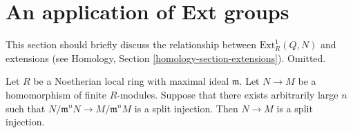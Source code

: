 \section{An application of Ext groups}
\label{section-ext-application}

\noindent
This section should briefly discuss the relationship between
$\text{Ext}^1_R(Q, N)$ and extensions (see
Homology, Section \ref{homology-section-extensions}).
Omitted.

\begin{lemma}
\label{lemma-split-injection-after-completion}
Let $R$ be a Noetherian local ring with maximal ideal $\mathfrak m$.
Let $N \to M$ be a homomorphism of finite $R$-modules.
Suppose that there exists arbitrarily large $n$ such that
$N/\mathfrak m^nN \to M/\mathfrak m^nM$ is a split injection.
Then $N \to M$ is a split injection.
\end{lemma}

